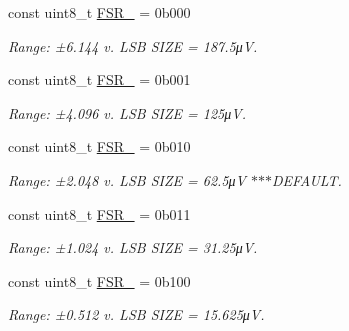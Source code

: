 \begin{DoxyCompactItemize}
const uint8\+\_\+t \mbox{\hyperlink{class_a_d_s1118_afc58ecaefacef5592c90c4c843d81dde}{F\+S\+R\+\_}} = 0b000
\begin{DoxyCompactList}\small\item\em Range\+: ±6.144 v. L\+SB S\+I\+ZE = 187.\+5μV. \end{DoxyCompactList}\item 
\mbox{\label{class_a_d_s1118_a9ef5d9e47353e4e30ceab533e2edf3ad}} 
const uint8\+\_\+t \mbox{\hyperlink{class_a_d_s1118_a9ef5d9e47353e4e30ceab533e2edf3ad}{F\+S\+R\+\_}} = 0b001
\begin{DoxyCompactList}\small\item\em Range\+: ±4.096 v. L\+SB S\+I\+ZE = 125μV. \end{DoxyCompactList}\item 
\mbox{\label{class_a_d_s1118_a2acfebaaa24ac5a6925be110a5a3edfa}} 
const uint8\+\_\+t \mbox{\hyperlink{class_a_d_s1118_a2acfebaaa24ac5a6925be110a5a3edfa}{F\+S\+R\+\_}} = 0b010
\begin{DoxyCompactList}\small\item\em Range\+: ±2.048 v. L\+SB S\+I\+ZE = 62.\+5μV $\ast$$\ast$$\ast$\+D\+E\+F\+A\+U\+LT. \end{DoxyCompactList}\item 
\mbox{\label{class_a_d_s1118_a64ab7dc3b0b643889a45b4a8a15ed73b}} 
const uint8\+\_\+t \mbox{\hyperlink{class_a_d_s1118_a64ab7dc3b0b643889a45b4a8a15ed73b}{F\+S\+R\+\_}} = 0b011
\begin{DoxyCompactList}\small\item\em Range\+: ±1.024 v. L\+SB S\+I\+ZE = 31.\+25μV. \end{DoxyCompactList}\item 
\mbox{\label{class_a_d_s1118_aa90c0882b487e68fa6cfe27790d6a5fa}} 
const uint8\+\_\+t \mbox{\hyperlink{class_a_d_s1118_aa90c0882b487e68fa6cfe27790d6a5fa}{F\+S\+R\+\_}} = 0b100
\begin{DoxyCompactList}\small\item\em Range\+: ±0.512 v. L\+SB S\+I\+ZE = 15.\+625μV. \end{DoxyCompactList}\item 
\mbox{\label{class_a_d_s1118_a5b0abd4476219e551141a10c1266c451}} 

\end{DoxyCompactItemize}
